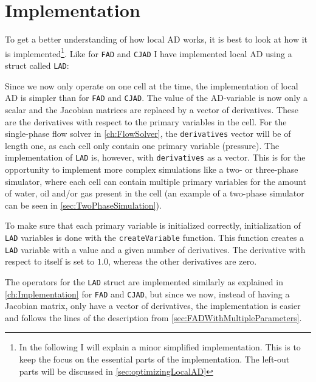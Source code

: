 \section{Implementation}
\label{sec:LADImplementation}
To get a better understanding of how local AD works, it is best to look at how it is implemented\footnote{In the following I will explain a minor simplified implementation. This is to keep the focus on the essential parts of the implementation. The left-out parts will be discussed in \autoref{sec:optimizingLocalAD}}. Like for \texttt{FAD} and \texttt{CJAD} I have implemented local AD using a struct called \texttt{LAD}:

Since we now only operate on one cell at the time, the implementation of local AD is simpler than for \texttt{FAD} and \texttt{CJAD}. The value of the AD-variable is now only a scalar and the Jacobian matrices are replaced by a vector of derivatives. These are the derivatives  with respect to the primary variables in the cell. For the single-phase flow solver in \autoref{ch:FlowSolver}, the \texttt{derivatives} vector will be of length one, as each cell only contain one primary variable (pressure). The implementation of \texttt{LAD} is, however, with \texttt{derivatives} as a vector. This is for the opportunity to implement more complex simulations like a two- or three-phase simulator, where each cell can contain multiple primary variables for the amount of water, oil and/or gas present in the cell (an example of a two-phase simulator can be seen in \autoref{sec:TwoPhaseSimulation}).

To make sure that each primary variable is initialized correctly, initialization of \texttt{LAD} variables is done with the \texttt{createVariable} function. This function creates a \texttt{LAD} variable with a value and a given number of derivatives. The derivative with respect to itself is set to $1.0$, whereas the other derivatives are zero.

The operators for the \texttt{LAD} struct are implemented similarly as explained in \autoref{ch:Implementation} for \texttt{FAD} and \texttt{CJAD}, but since we now, instead of having a Jacobian matrix, only have a vector of derivatives, the implementation is easier and follows the lines of the description from \autoref{sec:FADWithMultipleParameters}. 

